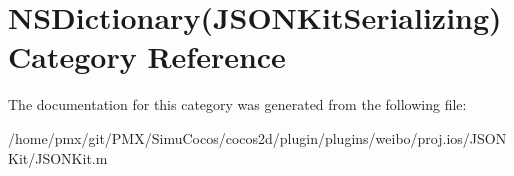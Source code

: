 \hypertarget{categoryNSDictionary_07JSONKitSerializing_08}{}\section{N\+S\+Dictionary(J\+S\+O\+N\+Kit\+Serializing) Category Reference}
\label{categoryNSDictionary_07JSONKitSerializing_08}


The documentation for this category was generated from the following file\+:\begin{DoxyCompactItemize}
\item 
/home/pmx/git/\+P\+M\+X/\+Simu\+Cocos/cocos2d/plugin/plugins/weibo/proj.\+ios/\+J\+S\+O\+N\+Kit/J\+S\+O\+N\+Kit.\+m\end{DoxyCompactItemize}
